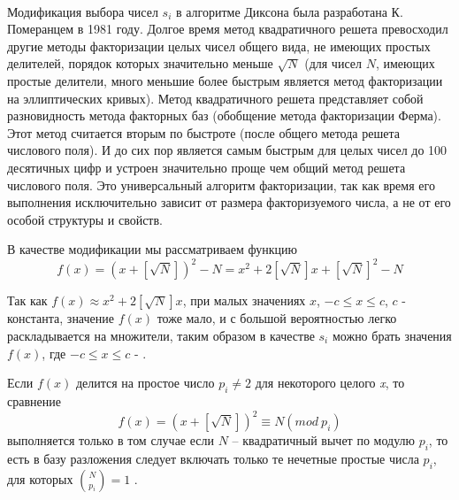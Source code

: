 \paragraph{} Модификация выбора чисел $s_{i}$ в алгоритме Диксона была разработана К. Померанцем в 1981 году. Долгое время метод квадратичного решета 
превосходил другие методы факторизации целых чисел общего вида, не имеющих простых делителей, порядок которых значительно меньше $\sqrt{N}$ 
(для чисел $N$, имеющих простые делители, много меньшие более быстрым является метод факторизации на эллиптических кривых). 
Метод квадратичного решета представляет собой разновидность метода факторных баз (обобщение метода факторизации Ферма). 
Этот метод считается вторым по быстроте (после общего метода решета числового поля). И до сих пор является самым быстрым для 
целых чисел до 100 десятичных цифр и устроен значительно проще чем общий метод решета числового поля. Это универсальный алгоритм факторизации, 
так как время его выполнения исключительно зависит от размера факторизуемого числа, а не от его особой структуры и свойств.

  В качестве модификации мы рассматриваем функцию    
    \begin{equation} \label{eq:prime-fact-fx1}
      f(x) = (x + [\sqrt{N}])^{2} - N = x^{2} + 2[\sqrt{N}]x + [\sqrt{N}]^{2} - N
    \end{equation}    

  Так как $f(x) \approx x^{2} + 2[\sqrt{N}]x$, при малых значениях $x$, $-c \le x \le c$, $c$ - константа, значение $f(x)$ тоже мало, и с большой вероятностью легко раскладывается на множители, таким образом в качестве $s_{i}$ можно брать значения $f(x)$, где $-c \le x \le c$ -
  \cite[Глава 6.4, страница 222]{mah06}.
  
  Если $f(x)$ делится на простое число $p_{i} \ne 2$ для некоторого целого \textit{x}, то сравнение  
    \begin{equation} \label{eq:prime-fact-fx2}
      f(x) = (x + [\sqrt{N}])^{2} \equiv N(mod \: p_{i})
    \end{equation}    
  выполняется только в том случае если $N$ – квадратичный вычет по модулю $p_{i}$, то есть в базу разложения следует включать 
  только те нечетные простые числа $p_{i}$, для которых $\binom{N}{p_{i}} = 1$ \cite[Глава 6.4, страница 223]{mah06}.
  
  
